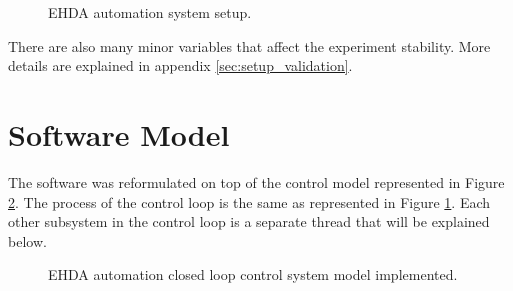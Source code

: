 \begin{figure}[H]
  \centering
  \caption{EHDA automation system setup.}
  \label{fig:setup}
\end{figure}

There are also many minor variables that affect the experiment stability. More details are explained in appendix \ref{sec:setup_validation}.


\section{Software Model}
\label{sec:control_model}

The software was reformulated on top of the control model represented in Figure \ref{fig:control_model_fig}. The process of the control loop is the same as represented in Figure \ref{fig:setup}. 
Each other subsystem in the control loop is a separate thread that will be explained below.

\begin{figure}[H]
  \centering
  \caption{EHDA automation closed loop control system model implemented.}
  \label{fig:control_model_fig}
\end{figure}

